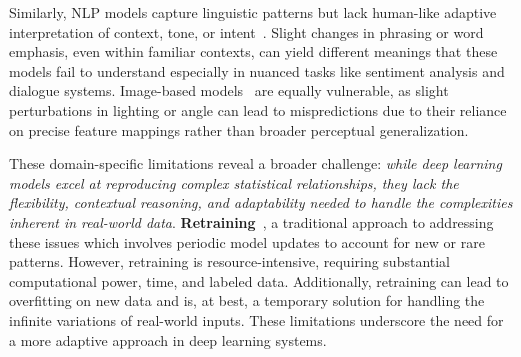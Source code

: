 Similarly, NLP models capture linguistic patterns but lack human-like adaptive interpretation of context, tone, or intent~\cite{chowdhary2020natural}. Slight changes in phrasing or word emphasis, even within familiar contexts, can yield different meanings that these models fail to understand especially in nuanced tasks like sentiment analysis and dialogue systems. Image-based models~\cite{xiao2022repairing,xiao2021selfchecking, wang2020dissector} are equally vulnerable, as slight perturbations in lighting or angle can lead to mispredictions due to their reliance on precise feature mappings rather than broader perceptual generalization.





These domain-specific limitations reveal a broader challenge: \textit{while deep learning models excel at reproducing complex statistical relationships, they lack the flexibility, contextual reasoning, and adaptability needed to handle the complexities inherent in real-world data}. \textbf{Retraining}~\cite{yuDataAugmentationProgram2022,xiao2021selfchecking,xiao2022repairing}, a traditional approach to addressing these issues which involves periodic model updates to account for new or rare patterns. However, retraining is resource-intensive, requiring substantial computational power, time, and labeled data. Additionally, retraining can lead to overfitting on new data and is, at best, a temporary solution for handling the infinite variations of real-world inputs. These limitations underscore the need for a more adaptive approach in deep learning systems.



